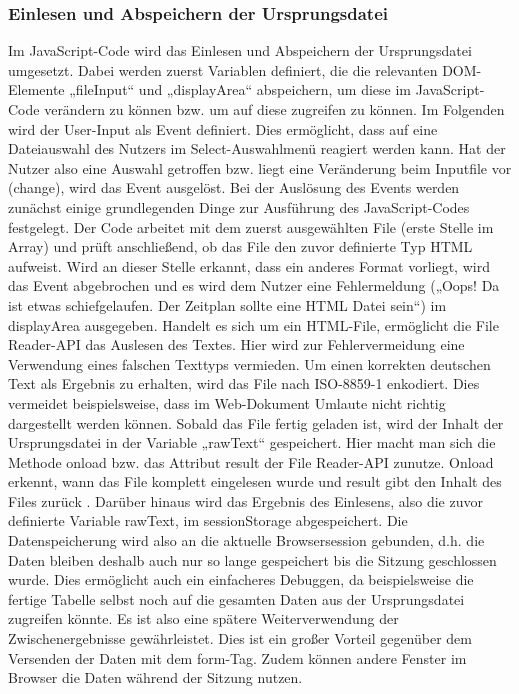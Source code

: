 \subsubsection{Einlesen und Abspeichern der Ursprungsdatei}
Im JavaScript-Code wird das Einlesen und Abspeichern der Ursprungsdatei umgesetzt. Dabei werden zuerst Variablen definiert, die die relevanten DOM-Elemente „fileInput“ und „displayArea“ abspeichern, um diese im JavaScript-Code verändern zu können bzw. um auf diese zugreifen zu können. 
Im Folgenden wird der User-Input als Event definiert. Dies ermöglicht, dass auf eine Dateiauswahl des Nutzers im Select-Auswahlmenü reagiert werden kann. Hat der Nutzer also eine Auswahl getroffen bzw. liegt eine Veränderung beim Inputfile vor (change), wird das Event ausgelöst. Bei der Auslösung des Events werden zunächst einige grundlegenden Dinge zur Ausführung des JavaScript-Codes festgelegt. 
Der Code arbeitet mit dem zuerst ausgewählten File (erste Stelle im Array) und prüft anschließend, ob das File den zuvor definierte Typ HTML aufweist. Wird an dieser Stelle erkannt, dass ein anderes Format vorliegt, wird das Event abgebrochen und es wird dem Nutzer eine Fehlermeldung („Oops! Da ist etwas schiefgelaufen. Der Zeitplan sollte eine HTML Datei sein“) im displayArea ausgegeben. 
Handelt es sich um ein HTML-File, ermöglicht die File Reader-\ac{API} das Auslesen des Textes. Hier wird zur Fehlervermeidung eine Verwendung eines falschen Texttyps vermieden. Um einen korrekten deutschen Text als Ergebnis zu erhalten, wird das File nach ISO-8859-1 enkodiert. Dies vermeidet beispielsweise, dass im Web-Dokument Umlaute nicht richtig dargestellt werden können. Sobald das File fertig geladen ist, wird der Inhalt der Ursprungsdatei in der Variable „rawText“ gespeichert. Hier macht man sich die Methode onload bzw. das Attribut result der File Reader-API zunutze. Onload erkennt, wann das File komplett eingelesen wurde und result gibt den Inhalt des Files zurück \cite{fileapi}. Darüber hinaus wird das Ergebnis des Einlesens, also die zuvor definierte Variable rawText, im sessionStorage abgespeichert. Die Datenspeicherung wird also an die aktuelle Browsersession gebunden, d.h. die Daten bleiben deshalb auch nur so lange gespeichert bis die Sitzung geschlossen wurde. Dies ermöglicht auch ein einfacheres Debuggen, da beispielsweise die fertige Tabelle selbst noch auf die gesamten Daten aus der Ursprungsdatei zugreifen könnte. Es ist also eine spätere Weiterverwendung der Zwischenergebnisse gewährleistet. Dies ist ein großer Vorteil gegenüber dem Versenden der Daten mit dem form-Tag. Zudem können andere Fenster im Browser die Daten während der Sitzung nutzen. 

